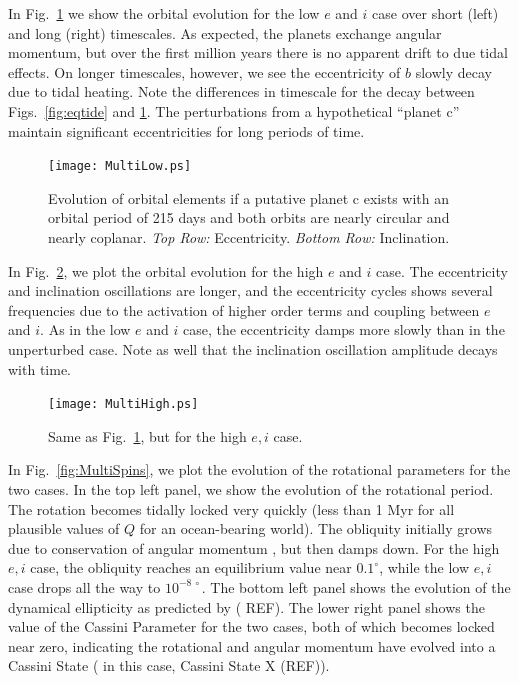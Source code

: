 \documentclass[preprint,12pt]{aastex}
\newcommand{\xxx}[1]{{\color{red} #1}} %
\begin{document}
In Fig.~\ref{fig:MultiLow} we show the orbital evolution for the low
$e$ and $i$ case over short (left) and long (right) timescales. As
expected, the planets exchange angular momentum, but over the first
million years there is no apparent drift to due tidal effects. On
longer timescales, however, we see the eccentricity of $b$ slowly decay
due to tidal heating. Note the differences in timescale for the decay
between Figs.~\ref{fig:eqtide} and \ref{fig:MultiLow}. The
perturbations from a hypothetical ``planet c'' maintain significant
eccentricities for long periods of time.

\begin{figure} 
\begin{center}
\texttt{[image: MultiLow.ps]}
\end{center}
\caption{Evolution of orbital elements if a putative planet c exists
  with an orbital period of 215 days and both orbits are nearly
  circular and nearly coplanar. {\it Top Row:} Eccentricity. {\it
    Bottom Row:} Inclination.}
\label{fig:MultiLow}
\end{figure}

In Fig.~\ref{fig:MultiHigh}, we plot the orbital evolution for the
high $e$ and $i$ case. The eccentricity and inclination oscillations
are longer, and the eccentricity cycles shows several frequencies due
to the activation of higher order terms and coupling between $e$ and
$i$. As in the low $e$ and $i$ case, the eccentricity damps more
slowly than in the unperturbed case. Note as well that the inclination
oscillation amplitude decays with time.

\begin{figure} 
\begin{center}
\texttt{[image: MultiHigh.ps]}
\end{center}
\caption{Same as Fig.~\ref{fig:MultiLow}, but for the high $e,i$ case.}
\label{fig:MultiHigh}
\end{figure}

In Fig.~\ref{fig:MultiSpins}, we plot the evolution of the rotational
parameters for the two cases. In the top left panel, we show the
evolution of the rotational period. The rotation becomes tidally
locked very quickly (less than 1 Myr for all plausible values of $Q$
for an ocean-bearing world). The obliquity initially grows due to
conservation of angular momentum \citep{Correia08}, but then damps
down. For the high $e,i$ case, the obliquity reaches an equilibrium
value near $0.1^\circ$, while the low $e,i$ case drops all the way to
$10^{-8~\circ}$. The bottom left panel shows the evolution of the
dynamical ellipticity as predicted by (\xxx{REF}). The lower right panel
shows the value of the Cassini Parameter for the two cases, both of
which becomes locked near zero, indicating the rotational and angular
momentum have evolved into a Cassini State (\xxx{in this case, Cassini
State X (REF)}).
\end{document}
